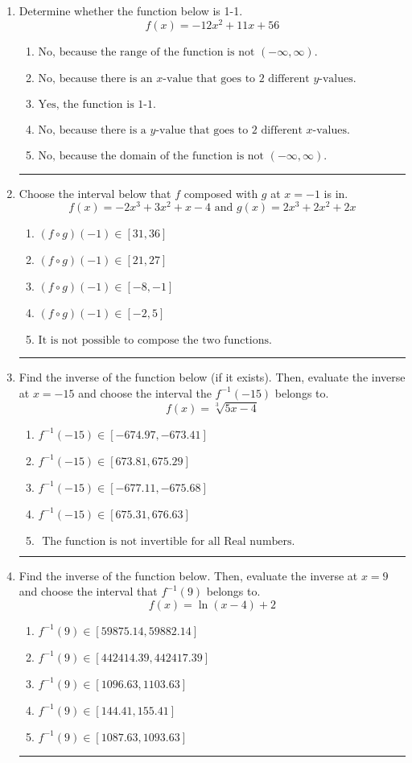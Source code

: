 \documentclass[14pt]{extbook}
\newcommand{\litem}[1]{\item#1\hspace*{-1cm}\rule{\textwidth}{0.4pt}}
\begin{document}
\begin{enumerate}
{\begin{enumerate}[label=\Alph*.]
\end{enumerate} }
\litem{
Determine whether the function below is 1-1.\[ f(x) = -12 x^2 + 11 x + 56 \]\begin{enumerate}[label=\Alph*.]
\item \( \text{No, because the range of the function is not $(-\infty, \infty)$.} \)
\item \( \text{No, because there is an $x$-value that goes to 2 different $y$-values.} \)
\item \( \text{Yes, the function is 1-1.} \)
\item \( \text{No, because there is a $y$-value that goes to 2 different $x$-values.} \)
\item \( \text{No, because the domain of the function is not $(-\infty, \infty)$.} \)

\end{enumerate} }
\litem{
Choose the interval below that $f$ composed with $g$ at $x=-1$ is in.\[ f(x) = -2x^{3} +3 x^{2} +x -4 \text{ and } g(x) = 2x^{3} +2 x^{2} +2 x \]\begin{enumerate}[label=\Alph*.]
\item \( (f \circ g)(-1) \in [31, 36] \)
\item \( (f \circ g)(-1) \in [21, 27] \)
\item \( (f \circ g)(-1) \in [-8, -1] \)
\item \( (f \circ g)(-1) \in [-2, 5] \)
\item \( \text{It is not possible to compose the two functions.} \)

\end{enumerate} }
\litem{
Find the inverse of the function below (if it exists). Then, evaluate the inverse at $x = -15$ and choose the interval the $f^{-1}(-15)$ belongs to.\[ f(x) = \sqrt[3]{5 x - 4} \]\begin{enumerate}[label=\Alph*.]
\item \( f^{-1}(-15) \in [-674.97, -673.41] \)
\item \( f^{-1}(-15) \in [673.81, 675.29] \)
\item \( f^{-1}(-15) \in [-677.11, -675.68] \)
\item \( f^{-1}(-15) \in [675.31, 676.63] \)
\item \( \text{ The function is not invertible for all Real numbers. } \)

\end{enumerate} }
\litem{
Find the inverse of the function below. Then, evaluate the inverse at $x = 9$ and choose the interval that $f^{-1}(9)$ belongs to.\[ f(x) = \ln{(x-4)}+2 \]\begin{enumerate}[label=\Alph*.]
\item \( f^{-1}(9) \in [59875.14, 59882.14] \)
\item \( f^{-1}(9) \in [442414.39, 442417.39] \)
\item \( f^{-1}(9) \in [1096.63, 1103.63] \)
\item \( f^{-1}(9) \in [144.41, 155.41] \)
\item \( f^{-1}(9) \in [1087.63, 1093.63] \)


\end{enumerate}}
\end{enumerate}
\end{document}
